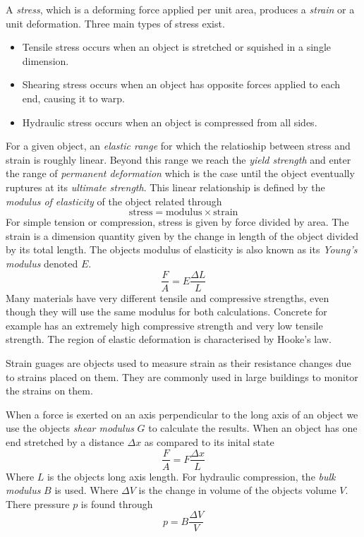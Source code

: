 \documentclass[12pt]{report}
\begin{document}
\begin{flushleft}
\bigskip
A \textit{stress}, which is a deforming force applied per unit area, produces
a \textit{strain} or a unit deformation. Three main types of stress exist.
\begin{itemize}
    \item Tensile stress occurs when an object is stretched or squished in a 
    single dimension.
    \item Shearing stress occurs when an object has opposite forces applied to
    each end, causing it to warp.
    \item Hydraulic stress occurs when an object is compressed from all sides.
\end{itemize}
For a given object, an \textit{elastic range} for which the relatioship between
stress and strain is roughly linear. Beyond this range we reach the 
\textit{yield strength} and enter the range of \textit{permanent deformation}
which is the case until the object eventually ruptures at its \textit{ultimate
strength}. This linear relationship is defined by the \textit{modulus of 
elasticity} of the object related through
\[\mathrm{stress} = \mathrm{modulus}\times\mathrm{strain}\]
For simple tension or compression, stress is given by force divided by area.
The strain is a dimension quantity given by the change in length of the object
divided by its total length. The objects modulus of elasticity is also known
as its \textit{Young's modulus} denoted \(E\).
\[\frac{F}{A} = E\frac{\Delta L}{L}\]
Many materials have very different tensile and compressive strengths, even
though they will use the same modulus for both calculations. Concrete for 
example has an extremely high compressive strength and very low tensile 
strength. The region of elastic deformation is characterised by Hooke's law.

\bigskip
Strain guages are objects used to measure strain as their resistance changes
due to strains placed on them. They are commonly used in large buildings to 
monitor the strains on them.

\bigskip
When a force is exerted on an axis perpendicular to the long axis of an object
we use the objects \textit{shear modulus} \(G\) to calculate the results. When
an object has one end stretched by a distance \(\Delta x\) as compared to its
inital state
\[\frac{F}{A} = F\frac{\Delta x}{L}\]
Where \(L\) is the objects long axis length. For hydraulic compression, the
\textit{bulk modulus} \(B\) is used. Where \(\Delta V\) is the change in volume
of the objects volume \(V\). There pressure \(p\) is found through
\[p = B\frac{\Delta V}{V}\]


\end{flushleft}
\end{document}
